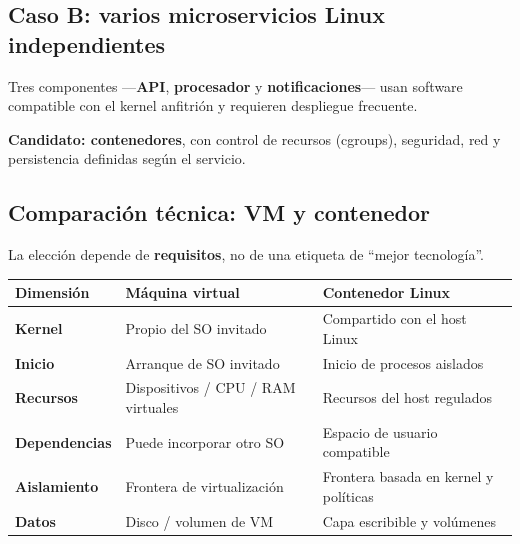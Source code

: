 \documentclass[11pt,a4paper]{article}
\begin{document}
\subsection{Caso B: varios microservicios Linux independientes}

Tres componentes —\textbf{API}, \textbf{procesador} y \textbf{notificaciones}— usan software
compatible con el kernel anfitrión y requieren despliegue frecuente.

\begin{center}
\end{center}

\begin{defbox}
\textbf{Candidato: contenedores}, con control de recursos (cgroups), seguridad, red y
persistencia definidas según el servicio.
\end{defbox}

\subsection{Comparación técnica: VM y contenedor}

La elección depende de \textbf{requisitos}, no de una etiqueta de \textquotedblleft mejor tecnología\textquotedblright.

\begin{center}
\renewcommand{\arraystretch}{1.35}
\begin{tabularx}{\textwidth}{@{}>{\bfseries}l >{\raggedright\arraybackslash}X >{\raggedright\arraybackslash}X@{}}
\toprule
\textbf{\normalfont\color{azulprof} Dimensión} & \textbf{\color{azulprof} Máquina virtual} & \textbf{\color{azulprof} Contenedor Linux} \\
\midrule
Kernel       & Propio del SO invitado          & Compartido con el host Linux \\
Inicio       & Arranque de SO invitado         & Inicio de procesos aislados \\
Recursos     & Dispositivos / CPU / RAM virtuales & Recursos del host regulados \\
Dependencias & Puede incorporar otro SO        & Espacio de usuario compatible \\
Aislamiento  & Frontera de virtualización      & Frontera basada en kernel y políticas \\
Datos        & Disco / volumen de VM           & Capa escribible y volúmenes \\
\bottomrule
\end{tabularx}
\end{center}
\end{document}
